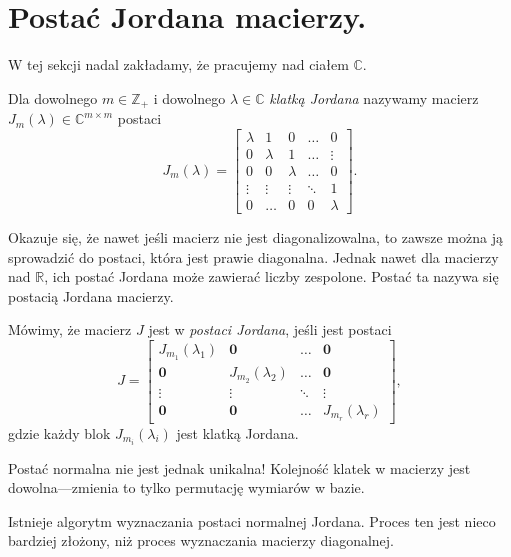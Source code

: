 \section{Postać Jordana macierzy.}

W tej sekcji nadal zakładamy, że pracujemy nad ciałem $\mathbb{C}$.

\begin{definition}
	Dla dowolnego $m \in \mathbb{Z}_+$ i dowolnego $\lambda \in \mathbb{C}$
		\textit{klatką Jordana} nazywamy macierz $J_m(\lambda) \in \mathbb{C}^{m \times m}$
	postaci
	\begin{equation}
		J_m(\lambda) = \left[\begin{matrix}
			\lambda & 1 & 0 & \dots & 0 \\
			0 & \lambda & 1 & \dots & \vdots \\
			0 & 0 & \lambda & \dots & 0 \\
			\vdots & \vdots & \vdots & \ddots & 1 \\
			0 & \dots & 0 & 0 & \lambda
		\end{matrix}\right].
	\end{equation}
\end{definition}

Okazuje się,
	że nawet jeśli macierz nie jest diagonalizowalna,
	to zawsze można ją sprowadzić do postaci,
	która jest prawie diagonalna.
Jednak nawet dla macierzy nad $\mathbb{R}$,
	ich postać Jordana może zawierać liczby zespolone.
Postać ta nazywa się postacią Jordana macierzy.
\begin{definition}
	Mówimy, że macierz $J$ jest w \textit{postaci Jordana},
		jeśli jest postaci
	\begin{equation}
		J = \left[\begin{matrix}
			J_{m_1}(\lambda_1) & \textbf{0} & \dots & \textbf{0} \\
			\textbf{0} & J_{m_2}(\lambda_2) & \dots & \textbf{0} \\
			\vdots & \vdots & \ddots & \vdots \\
			\textbf{0} & \textbf{0} & \dots & J_{m_r}(\lambda_r)
		\end{matrix}\right],
	\end{equation}
	gdzie każdy blok $J_{m_i}(\lambda_i)$ jest klatką Jordana.
\end{definition}
Postać normalna nie jest jednak unikalna!
Kolejność klatek w macierzy jest dowolna---zmienia to tylko permutację wymiarów w bazie.

Istnieje algorytm wyznaczania postaci normalnej Jordana.
Proces ten jest nieco bardziej złożony,
	niż proces wyznaczania macierzy diagonalnej.

